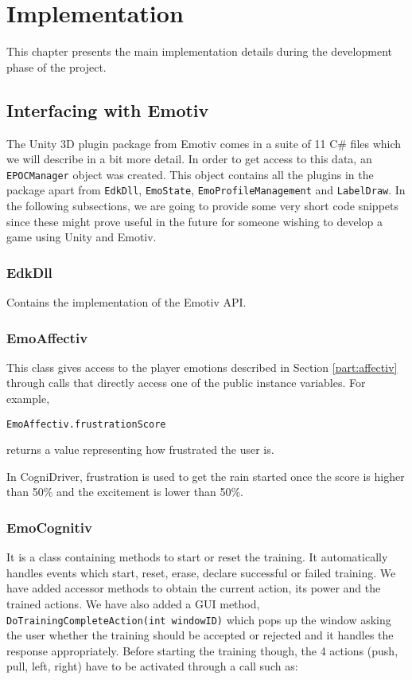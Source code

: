 \pagestyle{fancy}

\chapter{Implementation}
\label{cha:implementation}

This chapter presents the main implementation details during the development phase of the project.

\section{Interfacing with Emotiv}
The Unity 3D plugin package from Emotiv comes in a suite of 11 C\# files which we will describe in a bit more detail. In order to get access to this data, an  \texttt{EPOCManager} object was created. This object contains all the plugins in the package apart from  \texttt{EdkDll}, \texttt{EmoState}, \texttt{EmoProfileManagement} and \texttt{LabelDraw}. In the following subsections, we are going to provide some very short code snippets since these might prove useful in the future for someone wishing to develop a game using Unity and Emotiv.

\subsection{EdkDll}
Contains the implementation of the Emotiv API.

\subsection{EmoAffectiv} 
This class gives access to the player emotions described in Section \ref{part:affectiv} through calls that directly access one of the public instance variables. For example,

\begin{Verbatim}[frame=single, framesep=3mm]
EmoAffectiv.frustrationScore
\end{Verbatim}

returns a value representing how frustrated the user is.

In CogniDriver, frustration is used to get the rain started once the score is higher than 50\% and the excitement is lower than 50\%. 

\subsection{EmoCognitiv} 
It is a class containing methods to start or reset the training. It automatically handles events which start, reset, erase, declare successful or failed training. We have added accessor methods to obtain the current action, its power and the trained actions. We have also added a GUI method, \texttt{DoTrainingCompleteAction(int windowID)} which pops up the window asking the user whether the training should be accepted or rejected and it handles the response appropriately. Before starting the training though, the 4 actions (push, pull, left, right) have to be activated through a call such as: 

